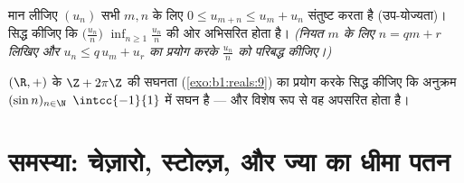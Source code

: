 \begin{exercise}[$\star\star\star$]\label{exo:b1:seq:11}
मान लीजिए $(u_n)$ सभी $m, n$ के लिए $0 \leq u_{m+n} \leq u_m + u_n$ संतुष्ट
करता है (उप-योज्यता)। सिद्ध कीजिए कि $\bigl(\frac{u_n}{n}\bigr)$ $\inf_{n
\geq 1} \frac{u_n}{n}$ की ओर अभिसरित होता है। \emph{(नियत $m$ के लिए $n = qm
+ r$ लिखिए और $u_n \leq q\,u_m + u_r$ का प्रयोग करके $\frac{u_n}{n}$ को
परिबद्ध कीजिए।)}
\end{exercise}

\begin{exercise}[$\star\star\star$]\label{exo:b1:seq:12}
$(\R, +)$ के  $\Z + 2\pi\Z$ की सघनता (\cref{exo:b1:reals:9}) का प्रयोग
करके सिद्ध कीजिए कि अनुक्रम $(\sin n)_{n \in \N}$ $\intcc{-1}{1}$ में सघन है
--- और विशेष रूप से वह अपसरित होता है।
\end{exercise}

\section{समस्या: चेज़ारो, स्टोल्ज़, और ज्या का धीमा पतन}


